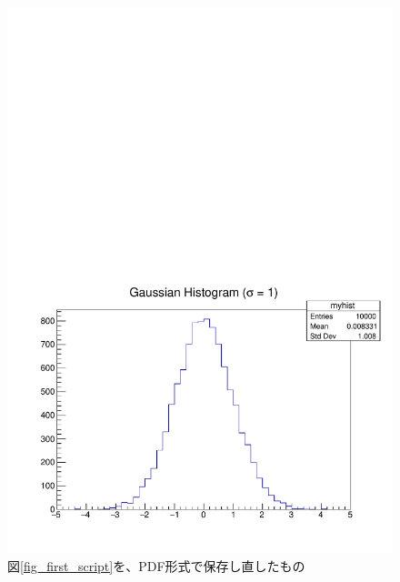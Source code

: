 \begin{figure}
  \centering
  \includegraphics[width=12cm,clip]{fig/first_script_pdf.pdf}
  \caption{図\ref{fig_first_script}を、PDF形式で保存し直したもの}
  \label{fig_first_script_pdf}
\end{figure}

